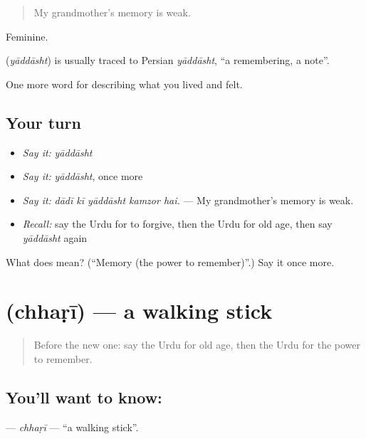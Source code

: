 \begin{quote}
My grandmother's memory is weak.
\end{quote}

Feminine.

\begin{cousinweb}
\textbf{} (\emph{yāddāsht}) is usually traced to Persian \emph{yāddāsht}, \textquotedblleft{}a remembering, a note\textquotedblright{}.
\end{cousinweb}

\begin{grammarlens}[title={What you've built}]
One more word for describing what you lived and felt.
\end{grammarlens}

\subsection*{Your turn}
\begin{itemize}
\raggedright
  \item \emph{Say it:} \emph{yāddāsht}
  \item \emph{Say it:} \emph{yāddāsht}, once more
  \item \emph{Say it:} \emph{dādī kī yāddāsht kamzor hai.} — My grandmother's memory is weak.
  \item \emph{Recall:} say the Urdu for to forgive, then the Urdu for old age, then say \emph{yāddāsht} again
\end{itemize}

\begin{tcolorbox}[breakable,colback=teal!4,colframe=teal!35!black,title={Before you move on}]
What does  mean? (\textquotedblleft{}Memory (the power to remember)\textquotedblright{}.) Say it once more.
\end{tcolorbox}
\section[\texorpdfstring{\ur{چھڑی} (chhaṛī)}{چھڑی (chhaṛī)}]{ (chhaṛī) — a walking stick}

\label{lesson:UR-C492-chhari}



\begin{quote}
Before the new one: say the Urdu for old age, then the Urdu for the power to remember.
\end{quote}

\subsection*{You'll want to know: }
\textbf{} — \emph{chhaṛī} — \textquotedblleft{}a walking stick\textquotedblright{}.

